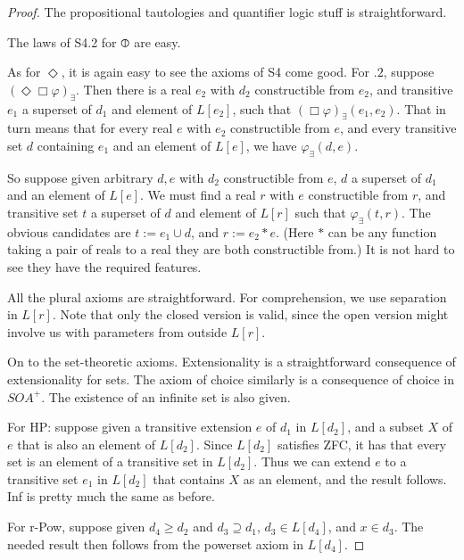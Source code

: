 \documentclass{article}
\begin{document}
    \begin{proof}
        The propositional tautologies and quantifier logic stuff is straightforward.
    
        The laws of S4.2 for $\circledbar$ are easy.

        As for $\Diamond$, it is again easy to see the axioms of S4 come good.
        For $.2$, suppose 
        $(\Diamond \Box \varphi)_\exists$. Then there is a real $e_2$ with $d_2$ constructible from
        $e_2$, and transitive $e_1$ a superset of $d_1$ and element of $L[e_2]$,
        such that $ (\Box \varphi)_\exists(e_1, e_2)$.
        That in turn means that for every real $e$ with $e_2$ constructible from $e$, and 
        every transitive 
        set $d$ containing $e_1$ and an element of $L[e]$, we have 
        $\varphi_\exists(d, e)$.

        So suppose given arbitrary $d, e$ with $d_2$ constructible from $e$, 
        $d$ a superset of $d_1$ and an element of $L[e]$. We must find a real $r$ 
        with $e$ constructible from $r$, and transitive set $t$ a superset of $d$ and element 
        of $L[r]$ such that $\varphi_\exists(t, r)$. The obvious candidates are 
        $t:= e_1 \cup d$, and $r := e_2*e$. (Here $*$ can be any function taking a pair of 
        reals to a real they are both constructible from.) It is not hard to see they 
        have the required features.

        All the plural axioms are straightforward. For comprehension, we use 
        separation in $L[r]$. Note that only the closed version is valid, 
        since the open version might involve us with parameters from outside 
        $L[r]$.
    
        On to the set-theoretic axioms. 
        Extensionality is a straightforward consequence of extensionality for 
        sets. The axiom of choice similarly is a consequence of choice in $SOA^+$.
        The existence of an infinite set is also given.
        
        For HP: suppose given a transitive extension $e$ of $d_1$ in $L[d_2]$,
        and a subset $X$ of $e$ that is also an element of $L[d_2]$. Since $L[d_2]$
        satisfies ZFC, it has that 
        every set is an element of a transitive set in $L[d_2]$.
        Thus we can extend $e$ to a transitive 
        set $e_1$ in $L[d_2]$ that contains $X$ as an element, and the result follows. 
        Inf is pretty much the same as before.
        
        For r-Pow, suppose given $d_4 \geq d_2$ and $d_3 \supseteq d_1$, $d_3 \in L[d_4]$,
        and $x \in d_3$. The needed result then follows from the powerset axiom in 
        $L[d_4]$.


\end{proof}
\end{document}
